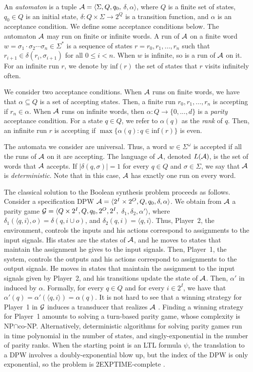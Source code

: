 \documentclass[runningheads,a4paper]{llncs}
\newcommand{\set}[1]{{\{#1\}}}
\newcommand{\zug}[1]{\langle #1  \rangle}
\newcommand{\DPW}{\mbox{\rm DPW}\xspace}
\newcommand{\A}{{\cal A}}
\newcommand{\G}{{\cal G}}
\newcommand{\maxs}[1]{\max\set{#1}}
\newcommand{\Inf}{\mbox{inf}}
\newcommand{\tIN}{{2^I}}
\newcommand{\tOUT}{{2^O}}
\begin{document}
An {\em automaton\/} is a tuple 
$\A=\langle\Sigma,Q,q_0,$ $\delta,\alpha\rangle$, where $Q$ is a finite set of states, $q_0 \in Q$ is an initial state, $\delta: Q\times \Sigma \to 2^Q$ is a transition function, and 
$\alpha$ is an acceptance condition. We define some acceptance conditions below.
The automaton $\A$ may run on finite or infinite words. 
A run of $\A$ on a finite word $w=\sigma_1 \cdot \sigma_2 \cdots \sigma_n\in \Sigma^*$ is a sequence of states $r=r_0,r_1,\ldots,r_n$ such that $r_{i+1} \in \delta(r_i,\sigma_{i+1})$ for all $0 \leq i < n$. When $w$ is infinite, so is a run of $\A$ on it. For an infinite run $r$, we denote by $\Inf(r)$ the set of states that $r$ visits infinitely often.
 
We consider two acceptance conditions. When $\A$ runs on finite words, we have that $\alpha \subseteq Q$ is a set of accepting states. Then, a finite run $r_0,r_1,\ldots,r_n$ is accepting if $r_n \in \alpha$. When $\A$ runs on infinite words, then $\alpha:Q\to \set{0,...,d}$ is a {\em parity\/} acceptance condition. For a state $q\in Q$, we refer to $\alpha(q)$ as the {\em rank} of $q$. Then, an infinite run $r$ is accepting if $\maxs{\alpha(q): q\in \Inf(r)}$ is even.

The automata we consider are universal. Thus, 
a word $w\in \Sigma^\omega$ is accepted if all the runs of $\A$ on it are accepting.  
The language of $\A$, denoted $L(\A)$, is the set of words that $\A$ accepts. 
If $|\delta(q,\sigma)|=1$ for every $q\in Q$ and $\sigma\in \Sigma$, we say that $\A$ is {\em deterministic}. Note that in this case, $\A$ has exactly one run on every word.




The classical solution to the Boolean synthesis problem proceeds as follows. Consider a specification \DPW
 $\A=\zug{\tIN\times\tOUT,Q,q_0,\delta,\alpha}$. We obtain from $\A$ a parity game
 $\G=\langle Q \times 2^I,Q,q_0,2^O,2^I, $ $\delta_1,\delta_2,\alpha'\rangle$, where $\delta_1(\zug{q,i},o)=\delta(q, i \cup o)$, and $\delta_2(q,i)=\zug{q,i}$. Thus, Player~2, the environment, controls the inputs and his actions correspond to assignments to the input signals. His states are the states of $\A$, and he moves to states that maintain the assignment he gives to the input signals. Then, Player~1, the system, controls the outputs and his actions correspond to assignments to the output signals. He moves in states that maintain the assignment to the input signals given by Player~2, and his transitions update the state of $\A$. Then, $\alpha'$ in induced by $\alpha$. Formally, for every $q \in Q$ and for every $i \in 2^I$, we have that $\alpha'(q)=\alpha'(\zug{q,i})=\alpha(q)$. It is not hard to see that a winning strategy for Player~1 in $\G$ induces a transducer that realizes $\A$ \cite{PR89a}. 
Finding a winning strategy for Player~1 amounts to solving a turn-based parity game, whose complexity is NP$\cap$co-NP. Alternatively, deterministic algorithms for solving parity games run in time polynomial in the number of states, and singly-exponential in the number of parity ranks. When the starting point is an LTL formula $\psi$, the translation to a \DPW involves a doubly-exponential blow up, but the index of the \DPW is only exponential, so the problem is 2EXPTIME-complete \cite{Ros92}.
 
\end{document}
